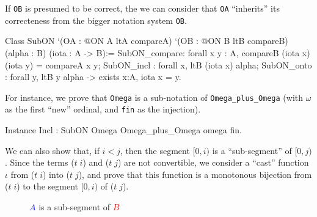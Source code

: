 \documentclass[a4paper]{book}
\begin{document}
If \texttt{OB} is presumed to be correct, the we can consider that \texttt{OA} ``inherits'' its correcteness from the bigger notation system \texttt{OB}.

\label{types:SubON}

\begin{Coqsrc}
Class  SubON 
       `(OA : @ON A ltA  compareA)
       `(OB : @ON B ltB  compareB)
       (alpha :  B)
       (iota : A -> B):=
  {
  SubON_compare: forall x y : A,  compareB (iota x) (iota y) =
                                 compareA x y;
  SubON_incl : forall x, ltB (iota x) alpha;
  SubON_onto : forall y, ltB y alpha  -> exists x:A, iota x = y}.
\end{Coqsrc}

For instance, we prove that \texttt{Omega} is a sub-notation of
\texttt{Omega\_plus\_Omega} (with $\omega$ as the first ``new'' ordinal, and \texttt{fin} as the injection).

\begin{Coqsrc}
Instance Incl : SubON Omega Omega_plus_Omega omega fin.
\end{Coqsrc}



We can also show that, if $i<j$, then the segment $[0,i)$ is a ``sub-segment'' of
$[0,j)$. Since the terms  ($t\;i$) and ($t\;j$) are not convertible, we consider a ``cast'' 
function $\iota$ from ($t\;i$) into ($t\;j$), and prove that this function is  a monotonous bijection  from ($t\;i$) to
the segment $[0,i)$ of ($t\;j$).




 \begin{figure}[h]
   \centering
   \caption{\textcolor{blue}{$A$} is a sub-segment  of \textcolor{red}{$B$}}
   \label{fig:subsegment}
 \end{figure}
\end{document}
